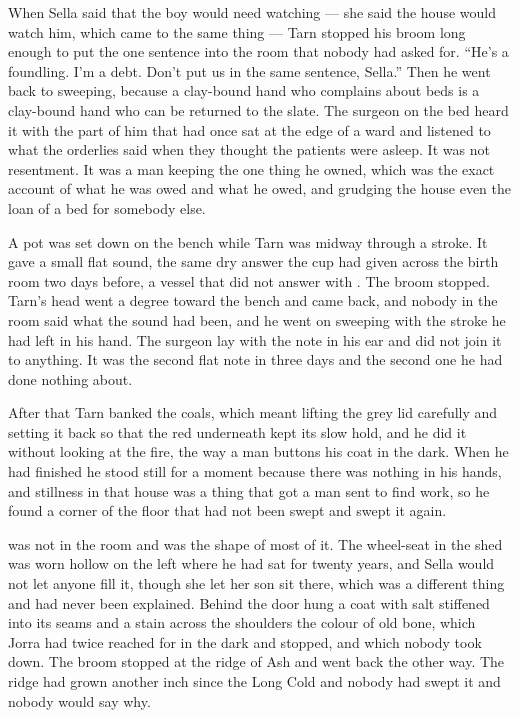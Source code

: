 When Sella said that the boy would need watching --- she said the house would watch him, which came to the same thing --- Tarn stopped his broom long enough to put the one sentence into the room that nobody had asked for. “He's a foundling. I'm a debt. Don't put us in the same sentence, Sella.” Then he went back to sweeping, because a clay-bound hand who complains about beds is a clay-bound hand who can be returned to the slate. The surgeon on the bed heard it with the part of him that had once sat at the edge of a ward and listened to what the orderlies said when they thought the patients were asleep. It was not resentment. It was a man keeping the one thing he owned, which was the exact account of what he was owed and what he owed, and grudging the house even the loan of a bed for somebody else.

A pot was set down on the bench while Tarn was midway through a stroke. It gave a small flat sound, the same dry answer the cup had given across the birth room two days before, a vessel that did not answer with . The broom stopped. Tarn's head went a degree toward the bench and came back, and nobody in the room said what the sound had been, and he went on sweeping with the stroke he had left in his hand. The surgeon lay with the note in his ear and did not join it to anything. It was the second flat note in three days and the second one he had done nothing about.

After that Tarn banked the coals, which meant lifting the grey lid carefully and setting it back so that the red underneath kept its slow hold, and he did it without looking at the fire, the way a man buttons his coat in the dark. When he had finished he stood still for a moment because there was nothing in his hands, and stillness in that house was a thing that got a man sent to find work, so he found a corner of the floor that had not been swept and swept it again.

\scenebreak

 was not in the room and was the shape of most of it. The wheel-seat in the shed was worn hollow on the left where he had sat for twenty years, and Sella would not let anyone fill it, though she let her son sit there, which was a different thing and had never been explained. Behind the door hung a coat with salt stiffened into its seams and a stain across the shoulders the colour of old bone, which Jorra had twice reached for in the dark and stopped, and which nobody took down. The broom stopped at the ridge of Ash and went back the other way. The ridge had grown another inch since the Long Cold and nobody had swept it and nobody would say why.

